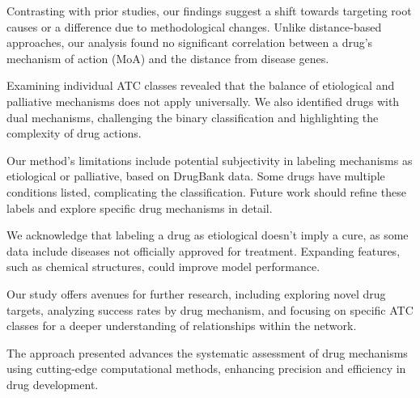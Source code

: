 \documentclass[journal,twoside,web]{ieeecolor}
\begin{document}
Contrasting with prior studies, our findings suggest a shift towards targeting root causes or a difference due to methodological changes. Unlike distance-based approaches, our analysis found no significant correlation between a drug's mechanism of action (MoA) and the distance from disease genes.

Examining individual ATC classes revealed that the balance of etiological and palliative mechanisms does not apply universally.
We also identified drugs with dual mechanisms, challenging the binary classification and highlighting the complexity of drug actions.

Our method's limitations include potential subjectivity in labeling mechanisms as etiological or palliative, based on DrugBank data.
Some drugs have multiple conditions listed, complicating the classification. 
Future work should refine these labels and explore specific drug mechanisms in detail.

We acknowledge that labeling a drug as etiological doesn't imply a cure, as some data include diseases not officially approved for treatment.
Expanding features, such as chemical structures, could improve model performance.

Our study offers avenues for further research, including exploring novel drug targets, analyzing success rates by drug mechanism, and focusing on specific ATC classes for a deeper understanding of relationships within the network.

The approach presented advances the systematic assessment of drug mechanisms using cutting-edge computational methods, enhancing precision and efficiency in drug development.



\end{document}
